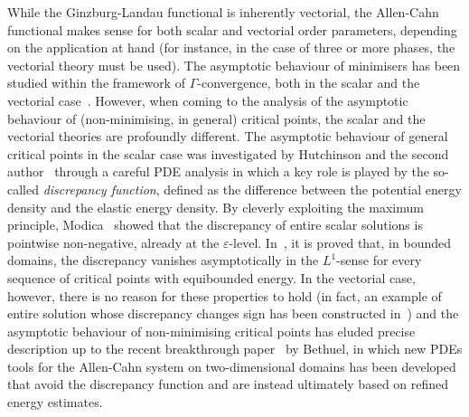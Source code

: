 \documentclass[a4paper, 11pt, twoside, leqno]{article}
\theoremstyle{definition}              %
\theoremstyle{remark}                  %
\newcommand{\eps}{\varepsilon}
\begin{document}
While the Ginzburg-Landau functional is inherently vectorial, 
the Allen-Cahn functional makes sense for both scalar and vectorial order parameters, 
depending on the application at hand (for instance, in the case of three or more 
phases, the vectorial theory must be used). 
The asymptotic behaviour of minimisers has been studied within the framework of 
$\Gamma$-convergence, both in the scalar and the vectorial 
case~\cite{Modica, Sternberg, FonsecaTartar, Baldo}.
However, when coming to the analysis of the asymptotic behaviour of 
(non-minimising, in general) critical points, 
the scalar and the vectorial theories are profoundly different.  
The asymptotic behaviour of general critical points in the scalar case was investigated 
by Hutchinson and the second author~\cite{HutchinsonTonegawa} 
through a careful PDE analysis  
in which a key role is played by the so-called \emph{discrepancy function},  
defined as the difference between the potential energy density and the elastic 
energy density. By cleverly exploiting the maximum principle, Modica~\cite{Modica} 
showed that the discrepancy of entire scalar solutions is pointwise non-negative, already 
at the $\eps$-level. In~\cite{HutchinsonTonegawa}, it is proved that,  
in bounded domains, the discrepancy vanishes asymptotically in the $L^1$-sense 
for every sequence of critical points with equibounded energy. In the vectorial case, 
however, there is no reason for these properties to hold (in fact,  
an example of entire solution whose discrepancy changes sign has been constructed in~\cite{Smyrnelis}) 
and the asymptotic behaviour of non-minimising critical points has eluded precise 
description up to the recent breakthrough paper~\cite{B} by Bethuel, 
in which new PDEs tools for the Allen-Cahn system on two-dimensional 
domains has been developed 
that avoid the discrepancy function and are instead ultimately based on refined 
energy estimates.
%
\end{document}
